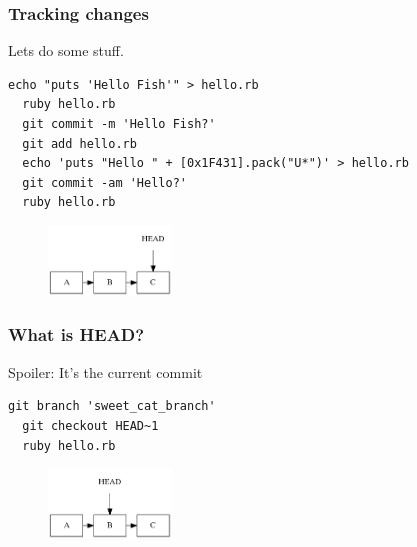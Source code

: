 \documentclass{beamer}
\begin{document}
\begin{frame}[fragile]
\frametitle{Tracking changes}

Lets do some stuff.

\vspace{1em}

\begin{lstlisting}[frame=single]
  echo "puts 'Hello Fish'" > hello.rb
  ruby hello.rb
  git commit -m 'Hello Fish?'
  git add hello.rb
  echo 'puts "Hello " + [0x1F431].pack("U*")' > hello.rb
  git commit -am 'Hello?'
  ruby hello.rb
\end{lstlisting}

\begin{figure}[p]
  \centering
  \includegraphics[height=5em]{some_commits.png}
\end{figure}

\end{frame}

\begin{frame}[fragile]
\frametitle{What is HEAD?}

Spoiler: It's the current commit

\vspace{1em}

\begin{lstlisting}[frame=single]
  git branch 'sweet_cat_branch'
  git checkout HEAD~1
  ruby hello.rb
\end{lstlisting}

\begin{figure}[p]
  \centering
  \includegraphics[height=5em]{head.png}
\end{figure}

\end{frame}
\end{document}
